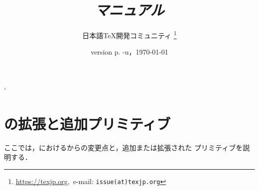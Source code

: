 \documentclass[uplatex,a4paper,11pt,nomag,dvipdfmx]{jsarticle}
\begin{document}
\catcode`
\title{\emph{\upTeX マニュアル}}
\author{日本語\TeX 開発コミュニティ\null
\thanks{\url{https://texjp.org},\ e-mail: \texttt{issue(at)texjp.org}}}
\date{version p\the\ptexversion.\the\ptexminorversion\ptexrevision
             -u\the\uptexversion\uptexrevision，\today}
\maketitle

\tableofcontents

\newpage

\part{\upTeX の拡張と追加プリミティブ}

ここでは，\upTeX における\pTeX からの変更点と，追加または拡張された
プリミティブを説明する．

%


%
%
%
\end{document}
